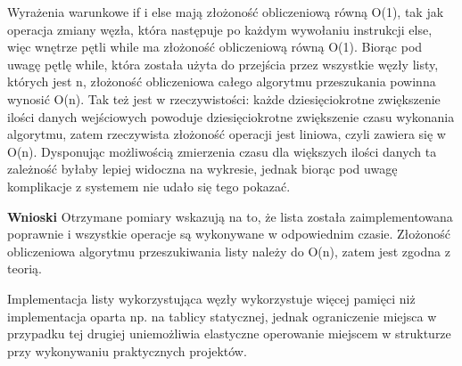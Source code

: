 \documentclass[10pt, a4paper]{article}
\begin{document}
\begin{flushleft}
Wyrażenia warunkowe if i else mają złożoność obliczeniową równą O(1), tak jak operacja zmiany węzła, która następuje po każdym wywołaniu instrukcji else, więc wnętrze pętli while ma złożoność obliczeniową równą O(1). Biorąc pod uwagę pętlę while, która została użyta do przejścia przez wszystkie węzły listy, których jest n, złożoność obliczeniowa całego algorytmu przeszukania powinna wynosić O(n). Tak też jest w rzeczywistości: każde dziesięciokrotne zwiększenie ilości danych wejściowych powoduje dziesięciokrotne zwiększenie czasu wykonania algorytmu, zatem rzeczywista złożoność operacji jest liniowa, czyli zawiera się w O(n). Dysponując możliwością zmierzenia czasu dla większych ilości danych ta zależność byłaby lepiej widoczna na wykresie, jednak biorąc pod uwagę komplikacje z systemem nie udało się tego pokazać.  \newline

\textbf{Wnioski} \newline \newline
Otrzymane pomiary wskazują na to, że lista została zaimplementowana poprawnie i wszystkie operacje są wykonywane w odpowiednim czasie. Złożoność obliczeniowa algorytmu przeszukiwania listy należy do O(n), zatem jest zgodna z teorią. \newline

Implementacja listy wykorzystująca węzły wykorzystuje więcej pamięci niż implementacja oparta np. na tablicy statycznej, jednak ograniczenie miejsca w przypadku tej drugiej uniemożliwia elastyczne operowanie miejscem w strukturze przy wykonywaniu praktycznych projektów. 

\end{flushleft}
\end{document}
